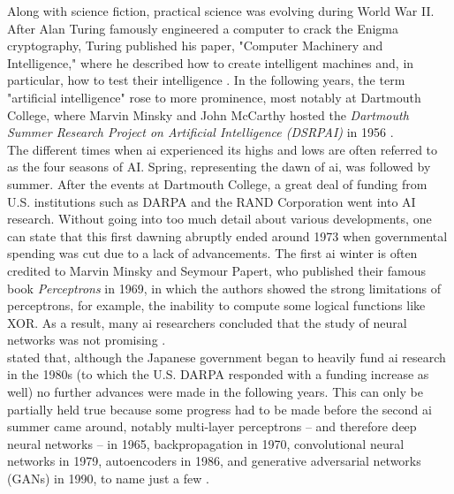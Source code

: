 \documentclass[
  a4paper,  %
  twoside,  %
  bibliography=totoc,
  headsepline,
  cleardoublepage=empty,
  parskip=half,
  draft=false
]{scrbook}
\begin{document}
Along with science fiction, practical science was evolving during World War II. After Alan Turing famously engineered a computer to crack the Enigma cryptography, Turing published his paper, "Computer Machinery and Intelligence," where he described how to create intelligent machines and, in particular, how to test their intelligence \cite{turingCOMPUTINGMACHINERYINTELLIGENCE1950}. In the following years, the term "artificial intelligence" rose to more prominence, most notably at Dartmouth College, where Marvin Minsky and John McCarthy hosted the \textit{Dartmouth Summer Research Project on Artificial Intelligence (DSRPAI)} in 1956 \cite{flasinskiHistoryArtificialIntelligence2016}. \\
The different times when \gls{ai} experienced its highs and lows are often referred to as the four seasons of AI. Spring, representing the dawn of \gls{ai}, was followed by summer. After the events at Dartmouth College, a great deal of funding from U.S. institutions such as DARPA and the RAND Corporation went into AI research. Without going into too much detail about various developments, one can state that this first dawning abruptly ended around 1973 when governmental spending was cut due to a lack of advancements. The first \gls{ai} winter is often credited to Marvin Minsky and Seymour Papert, who published their famous book \textit{Perceptrons} \cite{minskyPerceptronsIntroductionComputational2017} in 1969, in which the authors showed the strong limitations of perceptrons, for example, the inability to compute some logical functions like XOR. As a result, many \gls{ai} researchers concluded that the study of neural networks was not promising \cite{flasinskiHistoryArtificialIntelligence2016}. \\
 stated that, although the Japanese government began to heavily fund \gls{ai} research in the 1980s (to which the U.S. DARPA responded with a funding increase as well) no further advances were made in the following years. This can only be partially held true because some progress had to be made before the second \gls{ai} summer came around, notably multi-layer perceptrons – and therefore deep neural networks – in 1965, backpropagation in 1970, convolutional neural networks in 1979, autoencoders in 1986, and generative adversarial networks (GANs) in 1990, to name just a few \cite{schmidhuberAnnotatedHistoryModern2022}. \\
\end{document}
